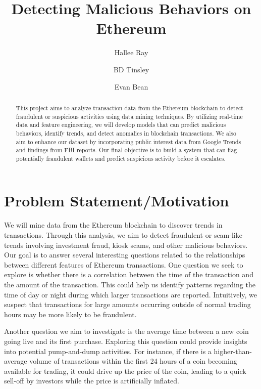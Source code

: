 \documentclass[sigconf]{acmart}
\title{Detecting Malicious Behaviors on Ethereum}
\author{Hallee Ray}
\affiliation{%
  \institution{University of Colorado - Boulder}
  \city{Boulder}
  \state{Colorado}
  \country{USA}
  \postcode{ZIP code}
}
\author{BD Tinsley}
\affiliation{%
  \institution{University of Colorado - Boulder}
  \city{Boulder}
  \state{Colorado}
  \country{USA}
  \postcode{ZIP code}
}
\author{Evan Bean}
\affiliation{%
  \institution{University of Colorado - Boulder}
  \city{Boulder}
  \state{Colorado}
  \country{USA}
  \postcode{ZIP code}
}
\begin{document}
\begin{abstract}
This project aims to analyze transaction data from the Ethereum blockchain to detect fraudulent or suspicious activities using data mining techniques. By utilizing real-time data and feature engineering, we will develop models that can predict malicious behaviors, identify trends, and detect anomalies in blockchain transactions. We also aim to enhance our dataset by incorporating public interest data from Google Trends and findings from FBI reports. Our final objective is to build a system that can flag potentially fraudulent wallets and predict suspicious activity before it escalates.
\end{abstract}


\maketitle

\section{Problem Statement/Motivation}

We will mine data from the Ethereum blockchain to discover trends in transactions. Through this analysis, we aim to detect fraudulent or scam-like trends involving investment fraud, kiosk scams, and other malicious behaviors. Our goal is to answer several interesting questions related to the relationships between different features of Ethereum transactions. One question we seek to explore is whether there is a correlation between the time of the transaction and the amount of the transaction. This could help us identify patterns regarding the time of day or night during which larger transactions are reported. Intuitively, we suspect that transactions for large amounts occurring outside of normal trading hours may be more likely to be fraudulent.

Another question we aim to investigate is the average time between a new coin going live and its first purchase. Exploring this question could provide insights into potential pump-and-dump activities. For instance, if there is a higher-than-average volume of transactions within the first 24 hours of a coin becoming available for trading, it could drive up the price of the coin, leading to a quick sell-off by investors while the price is artificially inflated.
\end{document}
